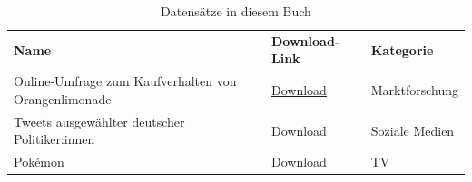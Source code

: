 \documentclass[
]{book}
\begin{document}
\begin{longtable}[]{@{}
  >{\raggedright\arraybackslash}p{}
  >{\raggedright\arraybackslash}p{}
  >{\raggedright\arraybackslash}p{}@{}}
\caption{Datensätze in diesem Buch}\tabularnewline
\toprule
\endhead
\textbf{Name} & \textbf{Download-Link} & \textbf{Kategorie} \\
Online-Umfrage zum Kaufverhalten von Orangenlimonade & \href{datasets/limonade.csv}{Download} & Marktforschung \\
Tweets ausgewählter deutscher Politiker:innen & Download & Soziale Medien \\
Pokémon & \href{datasets/pokemon.csv}{Download} & TV \\
\bottomrule
\end{longtable}

  
\end{document}
